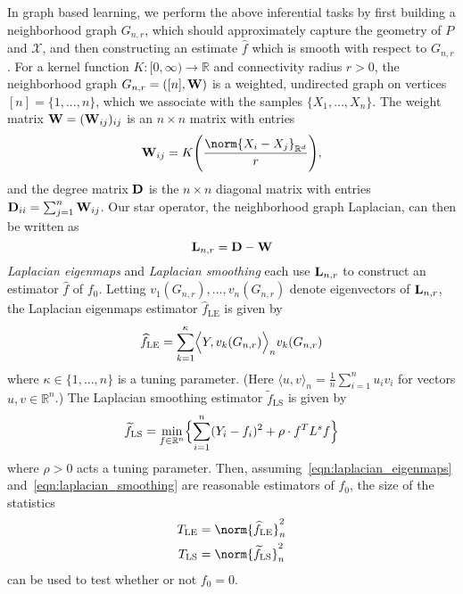 \documentclass{article}
\newcommand{\Reals}{\mathbb{R}}
\newcommand{\1}{\mathbf{1}}
\newcommand{\Rd}{\Reals^d}
\newcommand{\Lap}{{\bf L}}
\newcommand{\mc}[1]{\mathcal{#1}}
\newcommand{\dotp}[2]{\langle #1, #2 \rangle}
\newcommand{\Dotp}[2]{\Bigl\langle #1, #2 \Bigr\rangle}
\newcommand{\wt}[1]{\widetilde{#1}}
\newcommand{\wh}[1]{\widehat{#1}}
\newcommand{\LE}{\mathrm{LE}}
\newcommand{\LS}{\mathrm{LS}}
\theoremstyle{alden}
\theoremstyle{aldenthm}
\theoremstyle{definition}
\theoremstyle{remark}
\begin{document}
In graph based learning, we perform the above inferential tasks by first building a neighborhood graph $G_{n,r}$, which should approximately capture the geometry of $P$ and $\mc{X}$, and then constructing an estimate $\wh{f}$ which is smooth with respect to $G_{n,r}$. For a kernel function $K: [0,\infty) \to \Reals$ and connectivity radius $r > 0$, the neighborhood graph $G_{n,r} = ([n],{\bf W})$ is a weighted, undirected graph on vertices $[n] = \{1,...,n\}$, which we associate with the samples $\{X_1,\ldots,X_n\}$. The weight matrix ${\bf W} = ({\bf W}_{ij})_{ij}$ is an $n \times n$ matrix with entries
\begin{equation*}
\label{eqn:neighborhood_graph}
{\bf W}_{ij} = K\Biggl(\frac{\norm{X_i - X_j}_{\Rd}}{r}\Biggr),
\end{equation*}
and the degree matrix ${\bf D}$ is the $n \times n$ diagonal matrix with entries ${\bf D}_{ii} = \sum_{j = 1}^{n}{\bf W}_{ij}$.  Our star operator, the neighborhood graph Laplacian, can then be written as
\begin{equation}
\label{eqn:graph_Laplacian}
\Lap_{n,r} = \bf{D} - \bf{W}
\end{equation}
\emph{Laplacian eigenmaps} and \emph{Laplacian smoothing} each use $\Lap_{n,r}$ to construct an estimator $\wh{f}$ of $f_0$. Letting $v_1(G_{n,r}),\ldots,v_n(G_{n,r})$ denote eigenvectors of $\Lap_{n,r}$, the Laplacian eigenmaps estimator $\wh{f}_{\LE}$ \citep{belkin2003} is given by 
\begin{equation}
\label{eqn:laplacian_eigenmaps}
\wh{f}_{\textrm{LE}} = \sum_{k = 1}^{\kappa} \Dotp{Y}{v_k(G_{n,r})}_n v_{k}(G_{n,r})
\end{equation}
where $\kappa \in \{1,...,n\}$ is a tuning parameter. (Here $\dotp{u}{v}_n = \frac{1}{n}\sum_{i = 1}^{n} u_i v_i$ for vectors $u,v \in \Reals^n$.) The Laplacian smoothing estimator $\wt{f}_{\LS}$ \citep{smola2003} is given by
\begin{equation}
\label{eqn:laplacian_smoothing}
\wt{f}_{\LS}= \min_{f \in \Reals^n} \Bigl\{\sum_{i = 1}^{n}(Y_i - f_i)^2 + \rho \cdot f^T L^s f \Bigr\}
\end{equation}
where $\rho > 0$ acts a tuning parameter. Then, assuming~\eqref{eqn:laplacian_eigenmaps} and~\eqref{eqn:laplacian_smoothing} are reasonable estimators of $f_0$, the size of the statistics
\begin{align}
T_{\LE} & = \norm{\wh{f}_{\LE}}_n^2 \label{eqn:laplacian_eigenmaps_test}\\
T_{\LS} & = \norm{\wt{f}_{\LS}}_n^2 \label{eqn:laplacian_smoothing_test}
\end{align}
can be used to test whether or not $f_0 = 0$.
\end{document}
